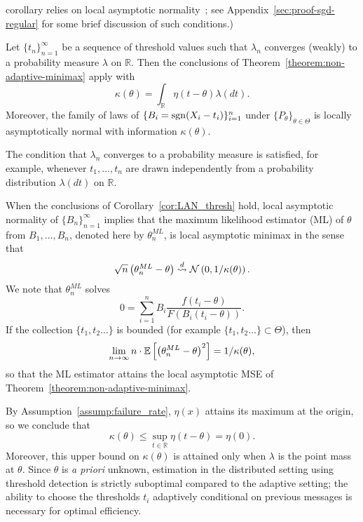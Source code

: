 corollary relies on local asymptotic normality~\cite[Ch.~7]{VanDerVaart98};
see Appendix~\ref{sec:proof-sgd-regular} for some brief discussion of such
conditions.)
\begin{cor} \label{cor:LAN_thresh}
  Let $\{t_n\}_{n=1}^\infty$ be a sequence of threshold values such that
  $\lambda_n$ converges (weakly) to a probability measure $\lambda$ on
  $\mathbb R$. Then the conclusions of
  Theorem~\ref{theorem:non-adaptive-minimax} apply with
  \begin{equation*}
    \kappa(\theta) = \int_{\mathbb R} \eta(t-\theta) \lambda(dt). 
  \end{equation*}
  Moreover, the family of laws of $\{B_i = \mathrm{sgn}(X_i - t_i)\}_{i = 1}^n$
  under $\{P_\theta\}_{\theta \in \Theta}$ is locally asymptotically normal
  with information $\kappa(\theta)$.
\end{cor}

The condition that $\lambda_n$ converges to a probability measure is
satisfied, for example, whenever $t_1,\ldots,t_n$ are drawn
independently from a probability distribution $\lambda(dt)$ on $\mathbb
R$.

When the conclusions of Corollary~\ref{cor:LAN_thresh} hold, local asymptotic normality of $\{B_n\}_{n=1}^\infty$ implies that the maximum
likelihood estimator (ML) of $\theta$ from $B_1,\ldots,B_n$, denoted here by
${\theta}^{ML}_n$, is local asymptotic minimax in the sense that
\begin{equation*}
  \sqrt{n} \left( {\theta}^{ML}_n - \theta \right)
  \stackrel{d}{\rightsquigarrow} \mathcal{N}\left(0, 1/\kappa(\theta) \right). 
\end{equation*}
We note that ${\theta}^{ML}_n$ solves
\begin{equation}
  \label{eq:ML}
  0 = \sum_{i=1}^n B_i \frac{f \left( t_i-\theta\right) }{F \left(B_i  (t_i-\theta)\right) }.
\end{equation}
If the collection $\{t_1,t_2\ldots\}$ is bounded
(for example $\{t_1,t_2\ldots\} \subset \Theta$), then
\begin{equation*}
\lim_{n\to \infty} n \cdot \mathbb{E}\left[ \left({\theta}^{ML}_n - \theta \right)^2\right]  = 1/\kappa(\theta), 
\end{equation*} 
so that the ML estimator attains the local asymptotic MSE of Theorem~\ref{theorem:non-adaptive-minimax}.

By Assumption~\ref{assump:failure_rate},
$\eta(x)$ attains its maximum at the origin, so we conclude that
\begin{equation*}
  \kappa(\theta) \leq \sup_{t\in \mathbb R} \eta \left( t-\theta\right) = \eta(0).
\end{equation*}
Moreover, this upper bound on $\kappa(\theta)$ is attained only when
$\lambda$ is the point mass at $\theta$. Since $\theta$ is \emph{a priori}
unknown, estimation in the distributed setting using
threshold detection is strictly suboptimal compared to the adaptive
setting; the ability to choose the thresholds $t_i$
adaptively conditional on previous messages is necessary for optimal
efficiency.

